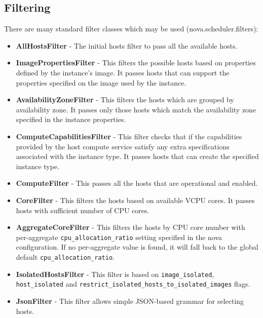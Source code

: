 \subsection{Filtering}\label{ssec:novafiltering}
There are many standard filter classes which may be used (nova.scheduler.filters):
\begin{itemize}
    \item \textbf{AllHostsFilter} - The initial hosts filter to pass all the available hosts.

    \item \textbf{ImagePropertiesFilter} - This filters the possible hosts based on properties defined by the instance's image. It passes hosts that can support the properties specified on the image used by the instance.

    \item \textbf{AvailabilityZoneFilter} - This filters the hosts which are grouped by availability zone. It passes only those hosts which match the availability zone specified in the instance properties.

    \item \textbf{ComputeCapabilitiesFilter} - This filter checks that if the capabilities provided by the host compute service satisfy any extra specifications associated with the instance type. It passes hosts that can create the specified instance type.

    \item \textbf{ComputeFilter} - This passes all the hosts that are operational and enabled.

    \item \textbf{CoreFilter} - This filters the hosts based on available VCPU cores. It passes hosts with sufficient number of CPU cores.

    \item \textbf{AggregateCoreFilter} - This filters the hosts by CPU core number with \\per-aggregate \verb|cpu_allocation_ratio| setting specified in the nova configuration. If no per-aggregate value is found, it will fall back to the global default \verb|cpu_allocation_ratio|.

    \item \textbf{IsolatedHostsFilter} - This filter is based on \verb|image_isolated|, \verb|host_isolated| and \verb|restrict_isolated_hosts_to_isolated_images| flags.

    \item \textbf{JsonFilter} - This filter allows simple JSON-based grammar for selecting hosts.


\end{itemize}

